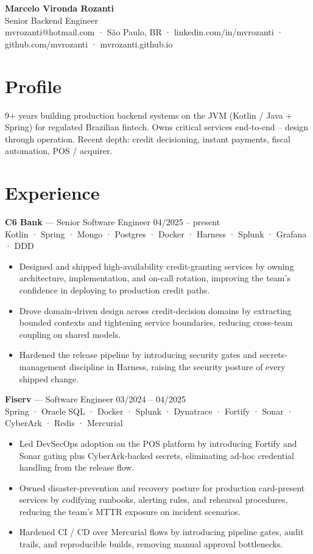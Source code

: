 \documentclass[10pt,a4paper]{article}
\begin{document}
\begin{center}
{\Huge\bfseries Marcelo Vironda Rozanti}\\[2pt]
{\large\color{accent} Senior Backend Engineer}\\[3pt]
{\small mvrozanti@hotmail.com · São Paulo, BR · linkedin.com/in/mvrozanti · github.com/mvrozanti · mvrozanti.github.io}
\end{center}

\section{Profile}
9+ years building production backend systems on the JVM (Kotlin / Java + Spring) for regulated Brazilian fintech. Owns critical services end-to-end -- design through operation. Recent depth: credit decisioning, instant payments, fiscal automation, POS / acquirer.

\section{Experience}

\noindent\textbf{C6 Bank} — Senior Software Engineer \hfill 04/2025 -- present\\
{\small\color{muted}Kotlin · Spring · Mongo · Postgres · Docker · Harness · Splunk · Grafana · DDD}
\begin{itemize}
\item Designed and shipped high-availability credit-granting services by owning architecture, implementation, and on-call rotation, improving the team's confidence in deploying to production credit paths.
\item Drove domain-driven design across credit-decision domains by extracting bounded contexts and tightening service boundaries, reducing cross-team coupling on shared models.
\item Hardened the release pipeline by introducing security gates and secrets-management discipline in Harness, raising the security posture of every shipped change.
\end{itemize}

\noindent\textbf{Fiserv} — Software Engineer \hfill 03/2024 -- 04/2025\\
{\small\color{muted}Spring · Oracle SQL · Docker · Splunk · Dynatrace · Fortify · Sonar · CyberArk · Redis · Mercurial}
\begin{itemize}
\item Led DevSecOps adoption on the POS platform by introducing Fortify and Sonar gating plus CyberArk-backed secrets, eliminating ad-hoc credential handling from the release flow.
\item Owned disaster-prevention and recovery posture for production card-present services by codifying runbooks, alerting rules, and rehearsal procedures, reducing the team's MTTR exposure on incident scenarios.
\item Hardened CI / CD over Mercurial flows by introducing pipeline gates, audit trails, and reproducible builds, removing manual approval bottlenecks.
\end{itemize}
\end{document}
